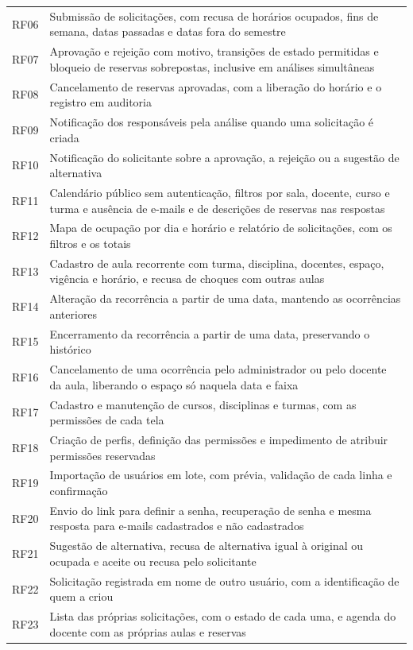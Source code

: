 \begin{apendicesenv}
\begin{SingleSpace}
\begin{longtable}{@{}>{\raggedright\arraybackslash}p{1.9cm}>{\raggedright\arraybackslash}p{12.6cm}@{}}
	RF06 & Submissão de solicitações, com recusa de horários ocupados, fins de semana, datas passadas e datas fora do semestre \\
	RF07 & Aprovação e rejeição com motivo, transições de estado permitidas e bloqueio de reservas sobrepostas, inclusive em análises simultâneas \\
	RF08 & Cancelamento de reservas aprovadas, com a liberação do horário e o registro em auditoria \\
	RF09 & Notificação dos responsáveis pela análise quando uma solicitação é criada \\
	RF10 & Notificação do solicitante sobre a aprovação, a rejeição ou a sugestão de alternativa \\
	RF11 & Calendário público sem autenticação, filtros por sala, docente, curso e turma e ausência de e-mails e de descrições de reservas nas respostas \\
	RF12 & Mapa de ocupação por dia e horário e relatório de solicitações, com os filtros e os totais \\
	RF13 & Cadastro de aula recorrente com turma, disciplina, docentes, espaço, vigência e horário, e recusa de choques com outras aulas \\
	RF14 & Alteração da recorrência a partir de uma data, mantendo as ocorrências anteriores \\
	RF15 & Encerramento da recorrência a partir de uma data, preservando o histórico \\
	RF16 & Cancelamento de uma ocorrência pelo administrador ou pelo docente da aula, liberando o espaço só naquela data e faixa \\
	RF17 & Cadastro e manutenção de cursos, disciplinas e turmas, com as permissões de cada tela \\
	RF18 & Criação de perfis, definição das permissões e impedimento de atribuir permissões reservadas \\
	RF19 & Importação de usuários em lote, com prévia, validação de cada linha e confirmação \\
	RF20 & Envio do link para definir a senha, recuperação de senha e mesma resposta para e-mails cadastrados e não cadastrados \\
	RF21 & Sugestão de alternativa, recusa de alternativa igual à original ou ocupada e aceite ou recusa pelo solicitante \\
	RF22 & Solicitação registrada em nome de outro usuário, com a identificação de quem a criou \\
	RF23 & Lista das próprias solicitações, com o estado de cada uma, e agenda do docente com as próprias aulas e reservas \\

\end{longtable}
\end{SingleSpace}
\end{apendicesenv}
